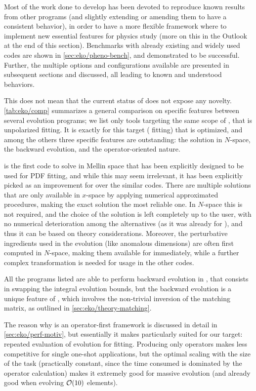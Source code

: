 Most of the work done to develop \eko{} has been devoted to reproduce known
results from other programs (and slightly extending or amending them to have a
consistent behavior), in order to have a more flexible framework where to
implement new essential features for physics study (more on this in the Outlook
at the end of this section).
Benchmarks with already existing and widely used codes are shown in
\cref{sec:eko/pheno-bench}, and demonstrated to be successful.
Further, the multiple options and configurations available are presented in
subsequent sections and discussed, all leading to known and understood
behaviors.

This does not mean that the current status of \eko{} does not expose any
novelty. \cref{tab:eko/comp} summarizes a general comparison on specific features
between several evolution programs; we list only tools targeting the same scope
of \eko{}, that is unpolarized \pdf{} fitting.
It is exactly for this target (\pdf{} fitting) that \eko{} is optimized, and
among the others three specific features are outstanding: the solution in
$N$-space, the backward \vfns{} evolution, and the operator-oriented nature.

\eko{} is the first code to solve \dglap{} in Mellin space that has been
explicitly designed to be used for PDF fitting, and while this may seem
irrelevant, it has been explicitly picked as an improvement for \eko{} over the
similar codes.
There are multiple solutions that are only available in $x$-space by applying
numerical approximated procedures, making the exact solution the most reliable
one.
In $N$-space this is not required, and the choice of the solution is left
completely up to the user, with no numerical deterioration among the
alternatives (as it was already for \pegasus{}), and thus it can be based on
theory considerations.
Moreover, the perturbative \qcd{} ingredients used in the evolution (like
anomalous dimensions) are often first computed in $N$-space, making them
available for \eko{} immediately, while a further complex transformation is
needed for usage in the other codes.

All the programs listed are able to perform backward evolution in \ffns{}, that
consists in swapping the integral evolution bounds, but the \vfns{} backward
evolution is a unique feature of \eko{}, which involves the non-trivial
inversion of the matching matrix, as outlined in
\cref{sec:eko/theory-matching}.

The reason why \eko{} is an operator-first framework is discussed in detail in
\cref{sec:eko/perf-motiv}, but essentially it makes \eko{} particularly suited
for our target: repeated evaluation of evolution for \pdf{} fitting.
Producing only operators makes \eko{} less competitive for single one-shot
applications, but the optimal scaling with the size of the task (practically
constant, since the time consumed is dominated by the operator calculation)
makes it extremely good for massive evolution (and already good when evolving
$\order{10}$ elements).

